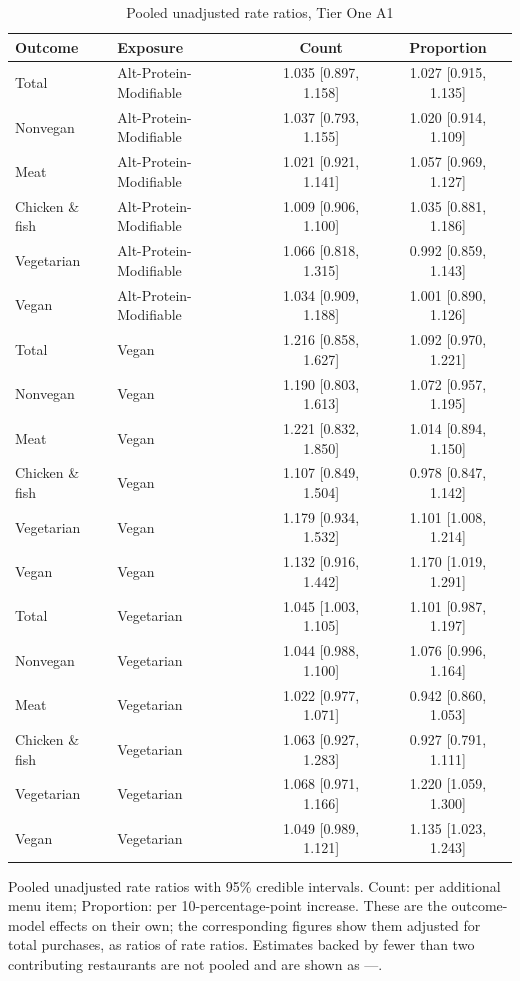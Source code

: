 \begin{table}[H]
\centering
\caption{Pooled unadjusted rate ratios, Tier One A1}
\label{tab:rr_t1_a1}
\begin{tabular}{llcc}
\toprule
Outcome & Exposure & Count & Proportion \\
\midrule
Total & Alt-Protein-Modifiable & 1.035 [0.897, 1.158] & 1.027 [0.915, 1.135] \\
Nonvegan & Alt-Protein-Modifiable & 1.037 [0.793, 1.155] & 1.020 [0.914, 1.109] \\
Meat & Alt-Protein-Modifiable & 1.021 [0.921, 1.141] & 1.057 [0.969, 1.127] \\
Chicken \& fish & Alt-Protein-Modifiable & 1.009 [0.906, 1.100] & 1.035 [0.881, 1.186] \\
Vegetarian & Alt-Protein-Modifiable & 1.066 [0.818, 1.315] & 0.992 [0.859, 1.143] \\
Vegan & Alt-Protein-Modifiable & 1.034 [0.909, 1.188] & 1.001 [0.890, 1.126] \\
Total & Vegan & 1.216 [0.858, 1.627] & 1.092 [0.970, 1.221] \\
Nonvegan & Vegan & 1.190 [0.803, 1.613] & 1.072 [0.957, 1.195] \\
Meat & Vegan & 1.221 [0.832, 1.850] & 1.014 [0.894, 1.150] \\
Chicken \& fish & Vegan & 1.107 [0.849, 1.504] & 0.978 [0.847, 1.142] \\
Vegetarian & Vegan & 1.179 [0.934, 1.532] & 1.101 [1.008, 1.214] \\
Vegan & Vegan & 1.132 [0.916, 1.442] & 1.170 [1.019, 1.291] \\
Total & Vegetarian & 1.045 [1.003, 1.105] & 1.101 [0.987, 1.197] \\
Nonvegan & Vegetarian & 1.044 [0.988, 1.100] & 1.076 [0.996, 1.164] \\
Meat & Vegetarian & 1.022 [0.977, 1.071] & 0.942 [0.860, 1.053] \\
Chicken \& fish & Vegetarian & 1.063 [0.927, 1.283] & 0.927 [0.791, 1.111] \\
Vegetarian & Vegetarian & 1.068 [0.971, 1.166] & 1.220 [1.059, 1.300] \\
Vegan & Vegetarian & 1.049 [0.989, 1.121] & 1.135 [1.023, 1.243] \\
\bottomrule
\end{tabular}
\par\smallskip\footnotesize Pooled unadjusted rate ratios with 95\% credible intervals. Count: per additional menu item; Proportion: per 10-percentage-point increase. These are the outcome-model effects on their own; the corresponding figures show them adjusted for total purchases, as ratios of rate ratios. Estimates backed by fewer than two contributing restaurants are not pooled and are shown as ---.
\end{table}
